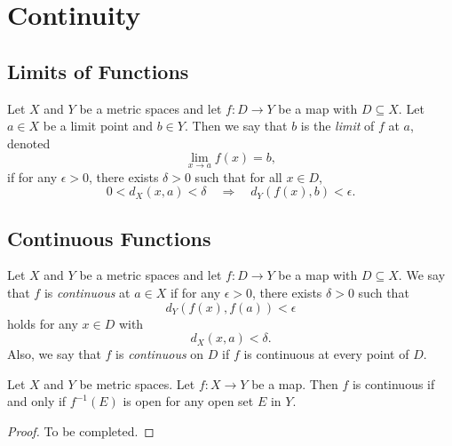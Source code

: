 \chapter{Continuity}
\section{Limits of Functions}
\begin{definition}
  Let $X$ and $Y$ be a metric spaces and let $f: D \to Y$ be a map with
  $D \subseteq X$.
  Let $a \in X$ be a limit point and $b \in Y$.
  Then we say that $b$ is the \emph{limit} of $f$ at $a$, denoted
  \begin{equation*}
    \lim_{x \to a} f(x) = b,
  \end{equation*}
  if for any $\epsilon > 0$, there exists $\delta > 0$ such that for all $x \in
  D$,
  \begin{equation*}
    0 < d_X(x, a) < \delta
    \quad \Rightarrow \quad
    d_Y(f(x), b) < \epsilon.
  \end{equation*}
\end{definition}

\section{Continuous Functions}
\begin{definition}
  Let $X$ and $Y$ be a metric spaces and let $f: D \to Y$ be a map with
  $D \subseteq X$.
  We say that $f$ is \emph{continuous} at $a \in X$ if for any $\epsilon > 0$,
  there exists $\delta > 0$ such that
  \begin{equation*}
    d_Y(f(x), f(a)) < \epsilon
  \end{equation*}
  holds for any $x \in D$ with
  \begin{equation*}
    d_X(x, a) < \delta.
  \end{equation*}
  Also, we say that $f$ is \emph{continuous} on $D$ if $f$ is continuous at
  every point of $D$.
\end{definition}

\begin{theorem}
  Let $X$ and $Y$ be metric spaces.
  Let $f: X \to Y$ be a map.
  Then $f$ is continuous if and only if $f^{-1}(E)$ is open for any open set
  $E$ in $Y$.
\end{theorem}
\begin{proof}
  To be completed.
\end{proof}

